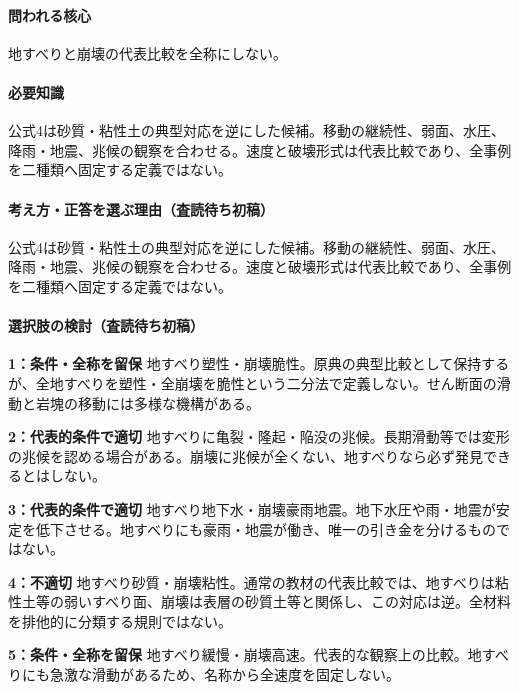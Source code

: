 \paragraph{問われる核心} 地すべりと崩壊の代表比較を全称にしない。

\paragraph{必要知識} 公式4は砂質・粘性土の典型対応を逆にした候補。移動の継続性、弱面、水圧、降雨・地震、兆候の観察を合わせる。速度と破壊形式は代表比較であり、全事例を二種類へ固定する定義ではない。

\paragraph{考え方・正答を選ぶ理由（査読待ち初稿）} 公式4は砂質・粘性土の典型対応を逆にした候補。移動の継続性、弱面、水圧、降雨・地震、兆候の観察を合わせる。速度と破壊形式は代表比較であり、全事例を二種類へ固定する定義ではない。

\paragraph{選択肢の検討（査読待ち初稿）}\mbox{}\par

\noindent\textbf{1：条件・全称を留保} 地すべり塑性・崩壊脆性。原典の典型比較として保持するが、全地すべりを塑性・全崩壊を脆性という二分法で定義しない。せん断面の滑動と岩塊の移動には多様な機構がある。\par

\noindent\textbf{2：代表的条件で適切} 地すべりに亀裂・隆起・陥没の兆候。長期滑動等では変形の兆候を認める場合がある。崩壊に兆候が全くない、地すべりなら必ず発見できるとはしない。\par

\noindent\textbf{3：代表的条件で適切} 地すべり地下水・崩壊豪雨地震。地下水圧や雨・地震が安定を低下させる。地すべりにも豪雨・地震が働き、唯一の引き金を分けるものではない。\par

\noindent\textbf{4：不適切} 地すべり砂質・崩壊粘性。通常の教材の代表比較では、地すべりは粘性土等の弱いすべり面、崩壊は表層の砂質土等と関係し、この対応は逆。全材料を排他的に分類する規則ではない。\par

\noindent\textbf{5：条件・全称を留保} 地すべり緩慢・崩壊高速。代表的な観察上の比較。地すべりにも急激な滑動があるため、名称から全速度を固定しない。\par

